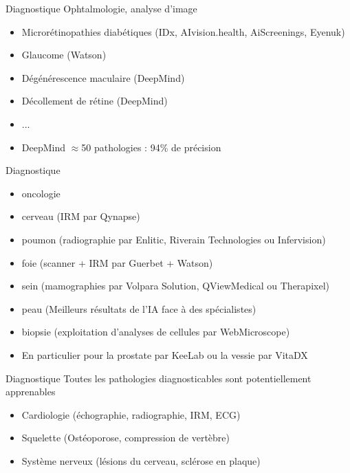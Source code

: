 \begin{frame}{Diagnostique}
  Ophtalmologie, analyse d'image
  \newline
  \newline
  \begin{minipage}[c]{0.65\linewidth}
    \begin{itemize}
    \item Microrétinopathies diabétiques (IDx, AIvision.health, AiScreenings, Eyenuk)
    \item Glaucome (Watson)
    \item Dégénérescence maculaire (DeepMind)
    \item Décollement de rétine (DeepMind)
    \item ...
    \item DeepMind $\approx$50 pathologies : 94\% de précision
    \end{itemize}
  \end{minipage}\hfill
  \begin{minipage}[c]{0.34\linewidth}
  \end{minipage}\hfill
\end{frame}

\begin{frame}{Diagnostique}
  \begin{itemize}
  \item oncologie
  \item cerveau (IRM par Qynapse)
  \item poumon (radiographie par Enlitic, Riverain Technologies ou Infervision)
  \item foie (scanner + IRM par Guerbet + Watson)
  \item sein (mamographies par Volpara Solution, QViewMedical ou Therapixel)
  \item peau (Meilleurs résultats de l'IA face à des spécialistes)
  \item biopsie (exploitation d'analyses de cellules par WebMicroscope)
  \item En particulier pour la prostate par KeeLab ou la vessie par VitaDX
  \end{itemize}
\end{frame}

\begin{frame}{Diagnostique}
  Toutes les pathologies diagnosticables sont potentiellement apprenables
    \begin{itemize}
    \item Cardiologie (échographie, radiographie, IRM, ECG)
    \item Squelette (Ostéoporose, compression de vertèbre)
    \item Système nerveux (lésions du cerveau, sclérose en plaque)
    \end{itemize}
\end{frame}

